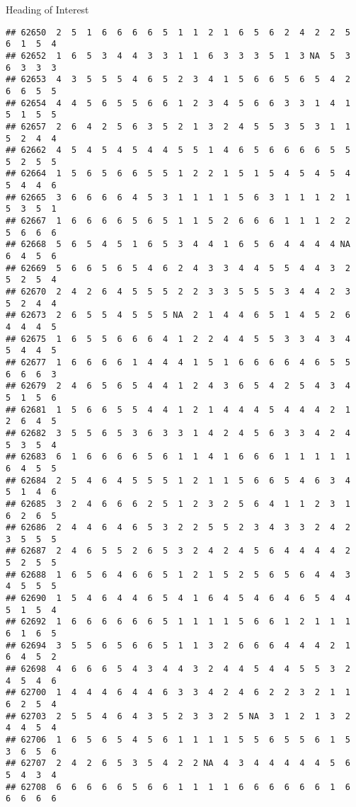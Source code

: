 \documentclass[
  ignorenonframetext,
]{beamer}
\begin{document}
\begin{frame}[fragile]{Heading of Interest}
\begin{verbatim}
## 62650  2  5  1  6  6  6  6  5  1  1  2  1  6  5  6  2  4  2  2  5  6  1  5  4
## 62652  1  6  5  3  4  4  3  3  1  1  6  3  3  3  5  1  3 NA  5  3  6  3  3  3
## 62653  4  3  5  5  5  4  6  5  2  3  4  1  5  6  6  5  6  5  4  2  6  6  5  5
## 62654  4  4  5  6  5  5  6  6  1  2  3  4  5  6  6  3  3  1  4  1  5  1  5  5
## 62657  2  6  4  2  5  6  3  5  2  1  3  2  4  5  5  3  5  3  1  1  5  2  4  4
## 62662  4  5  4  5  4  5  4  4  5  5  1  4  6  5  6  6  6  6  5  5  5  2  5  5
## 62664  1  5  6  5  6  6  5  5  1  2  2  1  5  1  5  4  5  4  5  4  5  4  4  6
## 62665  3  6  6  6  6  4  5  3  1  1  1  1  5  6  3  1  1  1  2  1  5  3  5  1
## 62667  1  6  6  6  6  5  6  5  1  1  5  2  6  6  6  1  1  1  2  2  5  6  6  6
## 62668  5  6  5  4  5  1  6  5  3  4  4  1  6  5  6  4  4  4  4 NA  6  4  5  6
## 62669  5  6  6  5  6  5  4  6  2  4  3  3  4  4  5  5  4  4  3  2  5  2  5  4
## 62670  2  4  2  6  4  5  5  5  2  2  3  3  5  5  5  3  4  4  2  3  5  2  4  4
## 62673  2  6  5  5  4  5  5  5 NA  2  1  4  4  6  5  1  4  5  2  6  4  4  4  5
## 62675  1  6  5  5  6  6  6  4  1  2  2  4  4  5  5  3  3  4  3  4  5  4  4  5
## 62677  1  6  6  6  6  1  4  4  4  1  5  1  6  6  6  6  4  6  5  5  6  6  6  3
## 62679  2  4  6  5  6  5  4  4  1  2  4  3  6  5  4  2  5  4  3  4  5  1  5  6
## 62681  1  5  6  6  5  5  4  4  1  2  1  4  4  4  5  4  4  4  2  1  2  6  4  5
## 62682  3  5  5  6  5  3  6  3  3  1  4  2  4  5  6  3  3  4  2  4  5  3  5  4
## 62683  6  1  6  6  6  6  5  6  1  1  4  1  6  6  6  1  1  1  1  1  6  4  5  5
## 62684  2  5  4  6  4  5  5  5  1  2  1  1  5  6  6  5  4  6  3  4  5  1  4  6
## 62685  3  2  4  6  6  6  2  5  1  2  3  2  5  6  4  1  1  2  3  1  6  2  6  5
## 62686  2  4  4  6  4  6  5  3  2  2  5  5  2  3  4  3  3  2  4  2  3  5  5  5
## 62687  2  4  6  5  5  2  6  5  3  2  4  2  4  5  6  4  4  4  4  2  5  2  5  5
## 62688  1  6  5  6  4  6  6  5  1  2  1  5  2  5  6  5  6  4  4  3  4  5  5  5
## 62690  1  5  4  6  4  4  6  5  4  1  6  4  5  4  6  4  6  5  4  4  5  1  5  4
## 62692  1  6  6  6  6  6  6  5  1  1  1  1  5  6  6  1  2  1  1  1  6  1  6  5
## 62694  3  5  5  6  5  6  6  5  1  1  3  2  6  6  6  4  4  4  2  1  6  4  5  2
## 62698  4  6  6  6  5  4  3  4  4  3  2  4  4  5  4  4  5  5  3  2  4  5  4  6
## 62700  1  4  4  4  6  4  4  6  3  3  4  2  4  6  2  2  3  2  1  1  6  2  5  4
## 62703  2  5  5  4  6  4  3  5  2  3  3  2  5 NA  3  1  2  1  3  2  4  4  5  4
## 62706  1  6  5  6  5  4  5  6  1  1  1  1  5  5  6  5  5  6  1  5  3  6  5  6
## 62707  2  4  2  6  5  3  5  4  2  2 NA  4  3  4  4  4  4  4  5  6  5  4  3  4
## 62708  6  6  6  6  6  5  6  6  1  1  1  1  6  6  6  6  6  6  1  6  6  6  6  6

\end{verbatim}
\end{frame}
\end{document}
